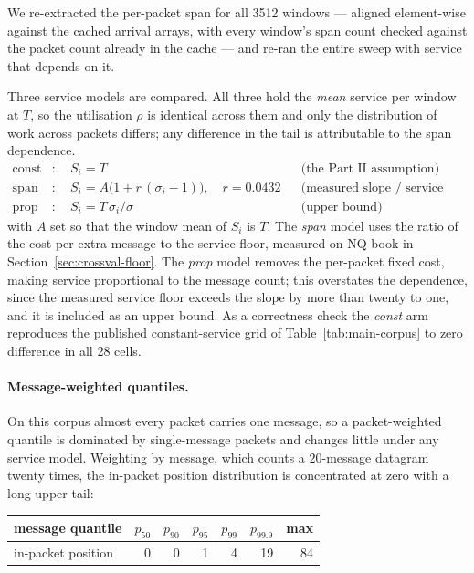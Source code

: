 \documentclass[11pt]{article}
\begin{document}
We re-extracted the per-packet span for all 3512 windows --- aligned element-wise against the
cached arrival arrays, with every window's span count checked against the packet count
already in the cache --- and re-ran the entire sweep with service that depends on it.

Three service models are compared. All three hold the \emph{mean} service per window at
$T$, so the utilisation $\rho$ is identical across them and only the distribution of work
across packets differs; any difference in the tail is attributable to the span
dependence.
\begin{align*}
\text{const} &: \quad S_i = T && \text{(the Part~II assumption)} \\
\text{span}  &: \quad S_i = A\big(1 + r\,(\sigma_i - 1)\big), \quad r = 0.0432
  && \text{(measured slope / service floor)} \\
\text{prop}  &: \quad S_i = T\,\sigma_i / \bar{\sigma} && \text{(upper bound)}
\end{align*}
with $A$ set so that the window mean of $S_i$ is $T$. The \emph{span} model uses the ratio of the cost per extra message to the service floor,
measured on NQ book in Section~\ref{sec:crossval-floor}.
The \emph{prop} model removes the per-packet fixed cost, making service proportional
to the message count; this overstates the dependence, since the measured service floor exceeds
the slope by more than twenty to one, and it is included as an upper bound. As a correctness check the \emph{const} arm reproduces the published
constant-service grid of Table~\ref{tab:main-corpus} to zero difference in all 28 cells.

\paragraph{Message-weighted quantiles.} On this corpus almost every packet carries one
message, so a packet-weighted quantile is dominated by single-message packets and
changes little under any service model. Weighting by message, which counts
a $20$-message datagram twenty times, the in-packet position distribution is concentrated
at zero with a long upper tail:

\begin{center}
\begin{tabular}{@{}lrrrrrr@{}}
\toprule
message quantile & $p_{50}$ & $p_{90}$ & $p_{95}$ & $p_{99}$ & $p_{99.9}$ & max \\
\midrule
in-packet position & 0 & 0 & 1 & 4 & 19 & 84 \\
\bottomrule
\end{tabular}
\end{center}
\end{document}
